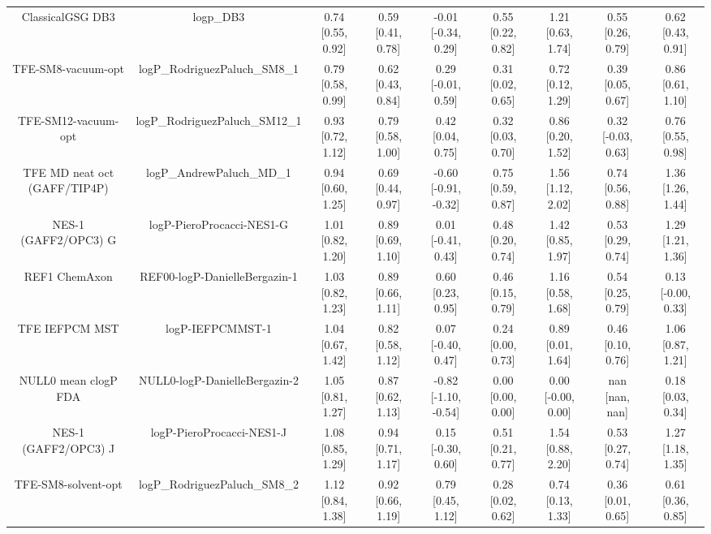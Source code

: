 \documentclass{article}
\begin{document}
\begin{center}
\begin{longtable}{|ccccccccc|}
            ClassicalGSG DB3 &                                     logp\_DB3 & 0.74 [0.55, 0.92] & 0.59 [0.41, 0.78] &  -0.01 [-0.34, 0.29] & 0.55 [0.22, 0.82] &    1.21 [0.63, 1.74] &    0.55 [0.26, 0.79] &    0.62 [0.43, 0.91] \\
          TFE-SM8-vacuum-opt &                 logP\_RodriguezPaluch\_SM8\_1 & 0.79 [0.58, 0.99] & 0.62 [0.43, 0.84] &   0.29 [-0.01, 0.59] & 0.31 [0.02, 0.65] &    0.72 [0.12, 1.29] &    0.39 [0.05, 0.67] &    0.86 [0.61, 1.10] \\
         TFE-SM12-vacuum-opt &                logP\_RodriguezPaluch\_SM12\_1 & 0.93 [0.72, 1.12] & 0.79 [0.58, 1.00] &    0.42 [0.04, 0.75] & 0.32 [0.03, 0.70] &    0.86 [0.20, 1.52] &   0.32 [-0.03, 0.63] &    0.76 [0.55, 0.98] \\
TFE MD neat oct (GAFF/TIP4P) &                     logP\_AndrewPaluch\_MD\_1 & 0.94 [0.60, 1.25] & 0.69 [0.44, 0.97] & -0.60 [-0.91, -0.32] & 0.75 [0.59, 0.87] &    1.56 [1.12, 2.02] &    0.74 [0.56, 0.88] &    1.36 [1.26, 1.44] \\
        NES-1 (GAFF2/OPC3) G &                     logP-PieroProcacci-NES1-G & 1.01 [0.82, 1.20] & 0.89 [0.69, 1.10] &   0.01 [-0.41, 0.43] & 0.48 [0.20, 0.74] &    1.42 [0.85, 1.97] &    0.53 [0.29, 0.74] &    1.29 [1.21, 1.36] \\
               REF1 ChemAxon &                 REF00-logP-DanielleBergazin-1 & 1.03 [0.82, 1.23] & 0.89 [0.66, 1.11] &    0.60 [0.23, 0.95] & 0.46 [0.15, 0.79] &    1.16 [0.58, 1.68] &    0.54 [0.25, 0.79] &   0.13 [-0.00, 0.33] \\
              TFE IEFPCM MST &                              logP-IEFPCMMST-1 & 1.04 [0.67, 1.42] & 0.82 [0.58, 1.12] &   0.07 [-0.40, 0.47] & 0.24 [0.00, 0.73] &    0.89 [0.01, 1.64] &    0.46 [0.10, 0.76] &    1.06 [0.87, 1.21] \\
        NULL0 mean clogP FDA &                 NULL0-logP-DanielleBergazin-2 & 1.05 [0.81, 1.27] & 0.87 [0.62, 1.13] & -0.82 [-1.10, -0.54] & 0.00 [0.00, 0.00] &   0.00 [-0.00, 0.00] &       nan [nan, nan] &    0.18 [0.03, 0.34] \\
        NES-1 (GAFF2/OPC3) J &                     logP-PieroProcacci-NES1-J & 1.08 [0.85, 1.29] & 0.94 [0.71, 1.17] &   0.15 [-0.30, 0.60] & 0.51 [0.21, 0.77] &    1.54 [0.88, 2.20] &    0.53 [0.27, 0.74] &    1.27 [1.18, 1.35] \\
         TFE-SM8-solvent-opt &                 logP\_RodriguezPaluch\_SM8\_2 & 1.12 [0.84, 1.38] & 0.92 [0.66, 1.19] &    0.79 [0.45, 1.12] & 0.28 [0.02, 0.62] &    0.74 [0.13, 1.33] &    0.36 [0.01, 0.65] &    0.61 [0.36, 0.85] \\

\end{longtable}
\end{center}
\end{document}
